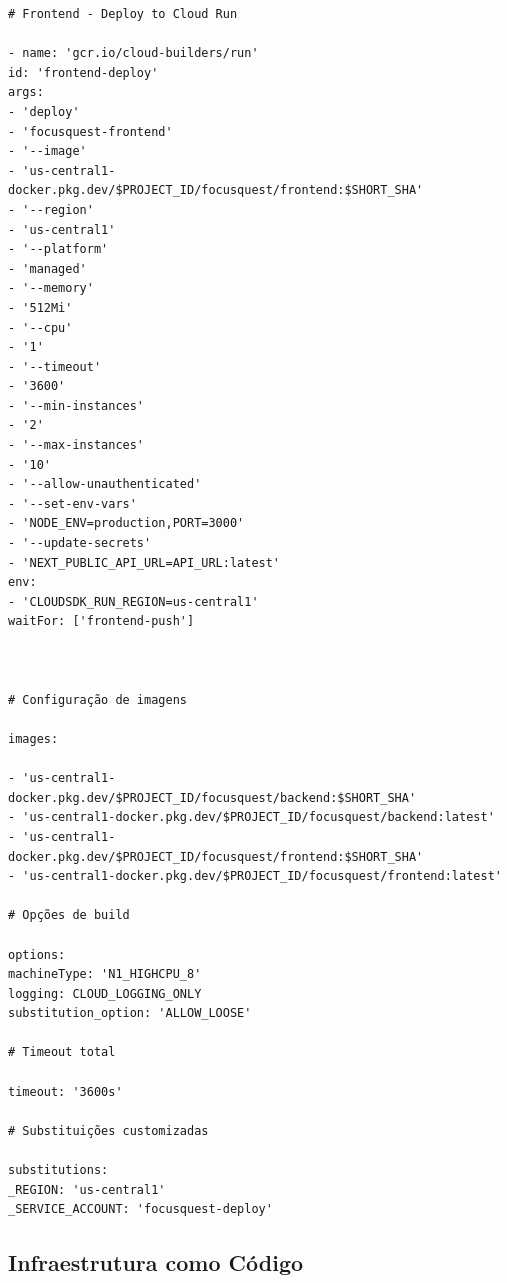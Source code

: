 \documentclass[11pt,a4paper]{article}
\begin{document}
\begin{verbatim}
# Frontend - Deploy to Cloud Run

- name: 'gcr.io/cloud-builders/run'
id: 'frontend-deploy'
args:
- 'deploy'
- 'focusquest-frontend'
- '--image'
- 'us-central1-docker.pkg.dev/$PROJECT_ID/focusquest/frontend:$SHORT_SHA'
- '--region'
- 'us-central1'
- '--platform'
- 'managed'
- '--memory'
- '512Mi'
- '--cpu'
- '1'
- '--timeout'
- '3600'
- '--min-instances'
- '2'
- '--max-instances'
- '10'
- '--allow-unauthenticated'
- '--set-env-vars'
- 'NODE_ENV=production,PORT=3000'
- '--update-secrets'
- 'NEXT_PUBLIC_API_URL=API_URL:latest'
env:
- 'CLOUDSDK_RUN_REGION=us-central1'
waitFor: ['frontend-push']



# Configuração de imagens

images:

- 'us-central1-docker.pkg.dev/$PROJECT_ID/focusquest/backend:$SHORT_SHA'
- 'us-central1-docker.pkg.dev/$PROJECT_ID/focusquest/backend:latest'
- 'us-central1-docker.pkg.dev/$PROJECT_ID/focusquest/frontend:$SHORT_SHA'
- 'us-central1-docker.pkg.dev/$PROJECT_ID/focusquest/frontend:latest'

# Opções de build

options:
machineType: 'N1_HIGHCPU_8'
logging: CLOUD_LOGGING_ONLY
substitution_option: 'ALLOW_LOOSE'

# Timeout total

timeout: '3600s'

# Substituições customizadas

substitutions:
_REGION: 'us-central1'
_SERVICE_ACCOUNT: 'focusquest-deploy'
\end{verbatim}

\subsection{Infraestrutura como Código}
\end{document}
